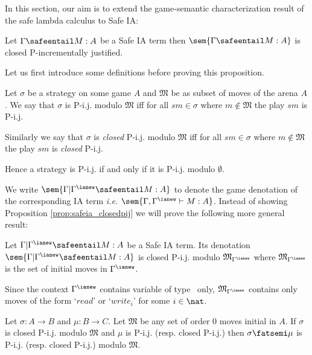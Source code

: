 In this section, our aim is to extend the game-semantic
characterization result of the safe lambda calculus to Safe IA:
\begin{proposition}
\label{prop:safeia_closedpij}
  Let $\Gamma \safeentail M : A$ be a Safe IA term then $\sem{\Gamma \safeentail M :
  A}$ is closed P-incrementally justified.
\end{proposition}


Let us first introduce some definitions before proving this
proposition.

\begin{definition}
\label{def:pij_modulo} Let $\sigma$ be a strategy on some game $A$
and $\mathfrak{M}$ be as subset of moves of the arena $A$. We say
that $\sigma$ is P-i.j. modulo $\mathfrak{M}$ iff for all $s m \in
\sigma$ where $m \not\in \mathfrak{M}$ the play $s m$ is P-i.j.

Similarly we say that $\sigma$ is \emph{closed} P-i.j. modulo
$\mathfrak{M}$ iff for all $s m \in \sigma$ where $m \not\in
\mathfrak{M}$ the play $s m$ is \emph{closed} P-i.j.

Hence a strategy is P-i.j. if and only if it is P-i.j. modulo
$\emptyset$.
\end{definition}

We write $\sem{\Gamma | \Gamma^{\ianew} \safeentail M : A}$ to
denote the game denotation of the corresponding IA term {\it i.e.}
$\sem{\Gamma, \Gamma^{\ianew} \vdash M : A}$. Instead of showing
Proposition \ref{prop:safeia_closedpij} we will prove the following
more general result:
\begin{proposition}
\label{prop:safeia_closedpijmodulo} Let $\Gamma | \Gamma^{\ianew}
\safeentail M : A $ be a Safe IA term. Its denotation $\sem{\Gamma |
\Gamma^{\ianew} \safeentail M : A}$ is closed P-i.j. modulo
$\mathfrak{M}_{\Gamma^{\ianew}}$ where
$\mathfrak{M}_{\Gamma^{\ianew}}$ is the set of initial moves in
$\Gamma^{\ianew}$.
\end{proposition}

\begin{remark}
Since the context $\Gamma^{\ianew}$ contains variable of type
\iavar\ only, $\mathfrak{M}_{\Gamma^{\ianew}}$ contains only moves
of the form `$read$' or `$write_i$' for some $i\in \nat$.
\end{remark}

\begin{lemma}
\label{lem:leftcompos_preserv_pijmodulo}
 Let $\sigma : A \rightarrow
B$ and $\mu : B \rightarrow C$.
  Let $\mathfrak{M}$ be any set of order $0$ moves initial in $A$.
  If $\sigma$ is closed  P-i.j. modulo $\mathfrak{M}$ and $\mu$ is
  P-i.j. (resp. closed P-i.j.) then $\sigma \fatsemi \mu$ is P-i.j. (resp. closed P-i.j.) modulo $\mathfrak{M}$.
\end{lemma}


